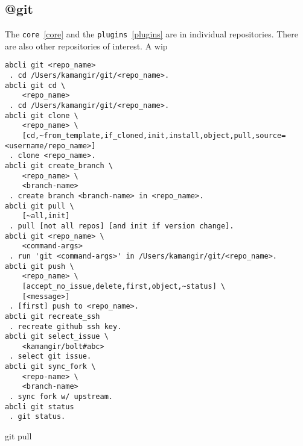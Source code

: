 \subsection{@git}
\label{git}

The \texttt{core}~\ref{core} and the \texttt{plugins}~\ref{plugins} are in individual repositories. There are also other repositories of interest. A wip


\begin{verbatim}
abcli git <repo_name>
 . cd /Users/kamangir/git/<repo_name>.
abcli git cd \
	<repo_name>
 . cd /Users/kamangir/git/<repo_name>.
abcli git clone \
	<repo_name> \
	[cd,~from_template,if_cloned,init,install,object,pull,source=<username/repo_name>]
 . clone <repo_name>.
abcli git create_branch \
	<repo_name> \
	<branch-name>
 . create branch <branch-name> in <repo_name>.
abcli git pull \
	[~all,init]
 . pull [not all repos] [and init if version change].
abcli git <repo_name> \
	<command-args>
 . run 'git <command-args>' in /Users/kamangir/git/<repo_name>.
abcli git push \
	<repo_name> \
	[accept_no_issue,delete,first,object,~status] \
	[<message>]
 . [first] push to <repo_name>.
abcli git recreate_ssh
 . recreate github ssh key.
abcli git select_issue \
	<kamangir/bolt#abc>
 . select git issue.
abcli git sync_fork \
	<repo-name> \
	<branch-name>
 . sync fork w/ upstream.
abcli git status
 . git status.
\end{verbatim}


git pull